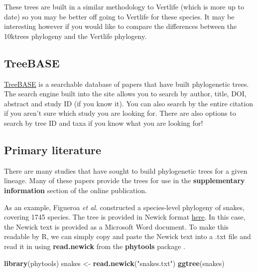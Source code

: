 \documentclass[
]{book}
\newenvironment{Shaded}{\begin{snugshade}}{\end{snugshade}}
\newcommand{\KeywordTok}[1]{\textcolor[rgb]{0.13,0.29,0.53}{\textbf{#1}}}
\newcommand{\NormalTok}[1]{#1}
\newcommand{\StringTok}[1]{\textcolor[rgb]{0.31,0.60,0.02}{#1}}
\begin{document}
These trees are built in a similar methodology to Vertlife (which is more up to date) so you may be better off going to Vertlife for these species. It may be interesting however if you would like to compare the differences between the 10ktrees phylogeny and the Vertlife phylogeny.

\hypertarget{treebase}{%
\subsection{TreeBASE}\label{treebase}}

\href{https://www.treebase.org/treebase-web/home.html}{TreeBASE} is a searchable database of papers that have built phylogenetic trees. The search engine built into the site allows you to search by author, title, DOI, abstract and study ID (if you know it). You can also search by the entire citation if you aren't sure which study you are looking for. There are also options to search by tree ID and taxa if you know what you are looking for!

\hypertarget{primary-literature}{%
\subsection{Primary literature}\label{primary-literature}}

There are many studies that have sought to build phylogenetic trees for a given lineage. Many of these papers provide the trees for use in the \textbf{supplementary information} section of the online publication.

As an example, Figueroa \emph{et al}. \citeyearpar{Figueroa16} constructed a species-level phylogeny of snakes, covering 1745 species. The tree is provided in Newick format \href{https://doi.org/10.1371/journal.pone.0161070.s003}{here}. In this case, the Newick text is provided as a Microsoft Word document. To make this readable by R, we can simply copy and paste the Newick text into a .txt file and read it in using \textbf{read.newick} from the \textbf{phytools} package \citep{phytools}.

\begin{Shaded}
\begin{Highlighting}[]
\KeywordTok{library}\NormalTok{(phytools)}
\NormalTok{snakes \textless{}{-}}\StringTok{ }\KeywordTok{read.newick}\NormalTok{(}\StringTok{"snakes.txt"}\NormalTok{)}
\KeywordTok{ggtree}\NormalTok{(snakes)}
\end{Highlighting}
\end{Shaded}
\end{document}
